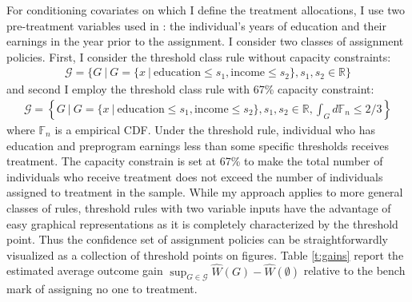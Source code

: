 \documentclass[12pt,oneside,reqno,english]{amsart}
\theoremstyle{definition}
\begin{document}
For conditioning covariates on which I define the treatment allocations, I use two pre-treatment variables used in \cite{KT:18}: 
the individual's years of education and their earnings in the year prior to the assignment.
I consider two classes of assignment policies. First, I consider the threshold class rule without capacity constraints:
\begin{align*}
\mathcal{G}=\{G\ | \ G=\{x \ | \ \mbox{education}\leq s_{1}, \mbox{income}\leq s_{2}\}, s_{1},s_{2}\in \mathbb{R} \}
\end{align*}
and second I employ the threshold class rule with 67\% capacity constraint:
\begin{align*}
\mathcal{G}=\left\{G\ | \ G=\{x \ | \ \mbox{education}\leq s_{1}, \mbox{income}\leq s_{2}\}, s_{1},s_{2}\in \mathbb{R}, \int_{G}d\mathbb{F}_{n}\leq 2/3 \right\}
\end{align*}
where $\mathbb{F}_{n}$ is a empirical CDF. Under the threshold rule, individual who has 
education and preprogram earnings less than some specific thresholds receives treatment. The capacity constrain is set at 67\% to make the total number of individuals who 
receive treatment does not exceed the number of individuals assigned to treatment in the sample. 
While my approach applies to more general classes of rules, threshold rules with two variable inputs have the advantage of easy graphical representations as it is completely characterized by the threshold point. Thus the confidence set of assignment policies can be straightforwardly visualized as a collection of threshold points on figures.   
Table \ref{t:gains} report the estimated average outcome gain $\sup_{G\in \mathcal{G}}\hat{W}(G)-\hat{W}(\emptyset)$ relative to the bench mark of assigning no one to treatment. 
\end{document}
